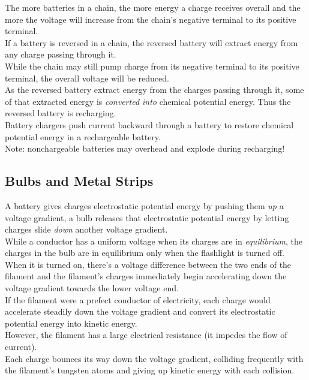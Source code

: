 \documentclass[12pt]{article}
\theoremstyle{definition}
\begin{document}
The more batteries in a chain, the more energy a charge receives overall and the more the voltage will increase from the chain's negative terminal to its positive terminal. \\
If a battery is reversed in a chain, the reversed battery will extract energy from any charge passing through it. \\
While the chain may still pump charge from its negative terminal to its positive terminal, the overall voltage will be reduced. \\

As the reversed battery extract energy from the charges passing through it, some of that extracted energy is \emph{converted into} chemical potential energy.
Thus the reversed battery is recharging. \\
Battery chargers push current backward through a battery to restore chemical potential energy in a rechargeable battery. \\
Note: nonchargeable batteries may overhead and explode during recharging!

\subsection{Bulbs and Metal Strips}
A battery gives charges electrostatic potential energy by pushing them \emph{up} a voltage gradient, a bulb releases that electrostatic potential energy by letting charges slide \emph{down} another voltage gradient. \\

While a conductor has a uniform voltage when its charges are in \emph{equilibrium}, the charges in the bulb are in equilibrium only when the flashlight is turned off. \\
When it is turned on, there's a voltage difference between the two ends of the filament and the filament's charges immediately begin accelerating down the voltage gradient towards the lower voltage end. \\

If the filament were a prefect conductor of electricity, each charge would accelerate steadily down the voltage gradient and convert its electrostatic potential energy into kinetic energy. \\
However, the filament has a large electrical resistance (it impedes the flow of current). \\
Each charge bounces its way down the voltage gradient, colliding frequently with the filament's tungsten atoms and giving up kinetic energy with each collision. \\
\end{document}
